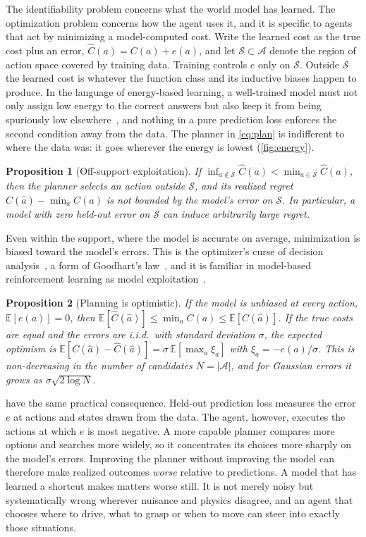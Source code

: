 \documentclass[11pt]{article}
\newtheorem{proposition}{Proposition}
\theoremstyle{definition}\newtheorem{definition}{Definition}
\newcommand{\E}{\mathbb{E}}
\newcommand{\supp}{\mathcal{S}}
\begin{document}
The identifiability problem concerns what the world model has learned. The optimization problem concerns how the agent uses it, and it is specific to agents that act by minimizing a model-computed cost. Write the learned cost as the true cost plus an error, $\hat C(a)=C(a)+e(a)$, and let $\supp\subset\mathcal A$ denote the region of action space covered by training data. Training controls $e$ only on $\supp$. Outside $\supp$ the learned cost is whatever the function class and its inductive biases happen to produce. In the language of energy-based learning, a well-trained model must not only assign low energy to the correct answers but also keep it from being spuriously low elsewhere~\citep{lecun2006ebm}, and nothing in a pure prediction loss enforces the second condition away from the data. The planner in \cref{eq:plan} is indifferent to where the data was: it goes wherever the energy is lowest (\cref{fig:energy}).

\begin{proposition}[Off-support exploitation]\label{prop:offsupport}
If $\inf_{a\notin\supp}\hat C(a)<\min_{a\in\supp}\hat C(a)$, then the planner selects an action outside $\supp$, and its realized regret $C(\hat a)-\min_a C(a)$ is not bounded by the model's error on $\supp$. In particular, a model with zero held-out error on $\supp$ can induce arbitrarily large regret.
\end{proposition}

Even within the support, where the model is accurate on average, minimization is biased toward the model's errors. This is the optimizer's curse of decision analysis~\citep{smith2006optimizer}, a form of Goodhart's law~\citep{goodhart}, and it is familiar in model-based reinforcement learning as model exploitation~\citep{janner2019mbpo}.

\begin{proposition}[Planning is optimistic]\label{prop:optimism}
If the model is unbiased at every action, $\E[e(a)]=0$, then $\E[\hat C(\hat a)]\le\min_aC(a)\le\E[C(\hat a)]$. If the true costs are equal and the errors are i.i.d.\ with standard deviation $\sigma$, the expected optimism is $\E[C(\hat a)-\hat C(\hat a)]=\sigma\,\E[\max_{a}\xi_a]$ with $\xi_a=-e(a)/\sigma$. This is non-decreasing in the number of candidates $N=|\mathcal A|$, and for Gaussian errors it grows as $\sigma\sqrt{2\log N}$.
\end{proposition}

 have the same practical consequence. Held-out prediction loss measures the error $e$ at actions and states drawn from the data. The agent, however, executes the actions at which $e$ is most negative. A more capable planner compares more options and searches more widely, so it concentrates its choices more sharply on the model's errors. Improving the planner without improving the model can therefore make realized outcomes \emph{worse} relative to predictions. A model that has learned a shortcut makes matters worse still. It is not merely noisy but systematically wrong wherever nuisance and physics disagree, and an agent that chooses where to drive, what to grasp or when to move can steer into exactly those situations.
\end{document}
